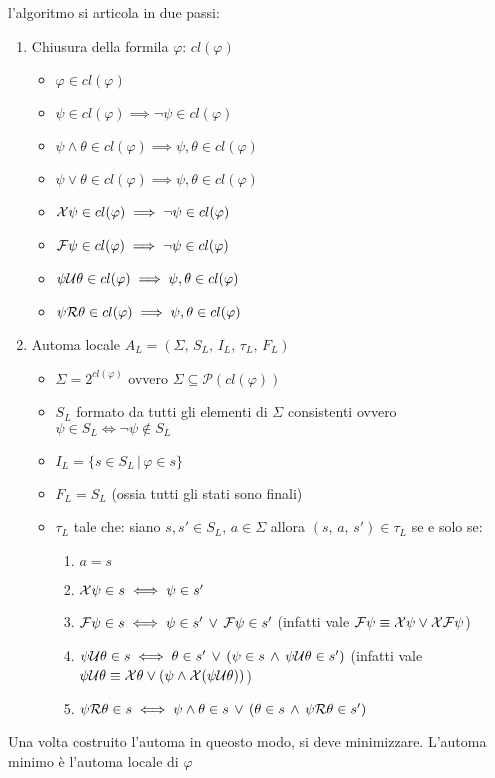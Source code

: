 l'algoritmo si articola in due passi:
\begin{enumerate}
\item Chiusura della formila $\varphi$: $cl(\varphi)$

\begin{itemize}
\item $\varphi\in cl(\varphi)$
\item $\psi\in cl(\varphi)\implies\neg\psi\in cl(\varphi)$
\item $\psi\wedge\theta\in cl(\varphi)\implies\psi,\theta\in cl(\varphi)$
\item $\psi\vee\theta\in cl(\varphi)\implies\psi,\theta\in cl(\varphi)$
\item $\mathcal{X}\psi\in cl(\varphi)\implies\neg\psi\in cl(\varphi)$
\item $\mathcal{F}\psi\in cl(\varphi)\implies\neg\psi\in cl(\varphi)$
\item $\psi\mathcal{U}\theta\in cl(\varphi)\implies\psi,\theta\in cl(\varphi)$
\item $\psi\mathcal{R}\theta\in cl(\varphi)\implies\psi,\theta\in cl(\varphi)$
\end{itemize}
\item Automa locale $A_{L}=(\Sigma,\, S_{L},\, I_{L},\,\tau_{L},\, F_{L})$

\begin{itemize}
\item $\Sigma=2^{cl(\varphi)}$ ovvero $\Sigma\subseteq\mathcal{P}(cl(\varphi))$
\item $S_{L}$ formato da tutti gli elementi di $\Sigma$ consistenti ovvero
$\psi\in S_{L}\iff\neg\psi\notin S_{L}$
\item $I_{L}=\{s\in S_{L}\,|\,\varphi\in s\}$
\item $F_{L}=S_{L}$ (ossia tutti gli stati sono finali)
\item $\tau_{L}$ tale che: siano $s,s'\in S_{L}$, $a\in\Sigma$ allora
$(s,\, a,\, s')\in\tau_{L}$ se e solo se:

\begin{enumerate}
\item $a=s$
\item $\mathcal{X}\psi\in s\iff\psi\in s'$
\item $\mathcal{F}\psi\in s\iff\psi\in s'\,\vee\,\mathcal{F}\psi\in s'$
(infatti vale $\mathcal{F}\psi\equiv\mathcal{X}\psi\vee\mathcal{X}\mathcal{F}\psi$)
\item $\psi\mathcal{U}\theta\in s\iff\theta\in s'\,\vee\,(\psi\in s\,\wedge\,\psi\mathcal{U}\theta\in s')$
(infatti vale $\psi\mathcal{U}\theta\equiv\mathcal{X}\theta\vee(\psi\wedge\mathcal{X}(\psi\mathcal{U}\theta))$)
\item $\psi\mathcal{R}\theta\in s\iff\psi\wedge\theta\in s\,\vee\,(\theta\in s\,\wedge\,\psi\mathcal{R}\theta\in s')$
\end{enumerate}
\end{itemize}
\end{enumerate}
Una volta costruito l'automa in queosto modo, si deve minimizzare.
L'automa minimo è l'automa locale di $\varphi$


